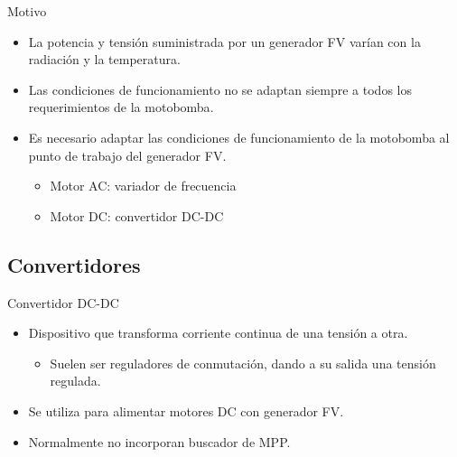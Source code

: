 \documentclass[xcolor={usenames,svgnames,dvipsnames}]{beamer}
\begin{document}
\begin{frame}[label={sec:org72d6883}]{Motivo}
\begin{itemize}
\item La \alert{potencia y tensión suministrada por un generador FV varían} con la radiación y la temperatura.

\item Las condiciones de funcionamiento \alert{no se adaptan siempre a todos los requerimientos de la motobomba}.

\item Es necesario adaptar las condiciones de funcionamiento de la motobomba al punto de trabajo del generador FV.

\begin{itemize}
\item \alert{Motor AC: variador de frecuencia}

\item \alert{Motor DC: convertidor DC-DC}
\end{itemize}
\end{itemize}
\end{frame}

\subsection{Convertidores}
\label{sec:org8749f2e}
\begin{frame}[label={sec:orgb78fae9}]{Convertidor DC-DC}
\begin{itemize}
\item Dispositivo que \alert{transforma corriente continua de una tensión a otra}.

\begin{itemize}
\item Suelen ser reguladores de conmutación, dando a su salida una tensión regulada.
\end{itemize}

\item Se utiliza para alimentar \alert{motores DC con generador FV}.

\item Normalmente no incorporan buscador de MPP.
\end{itemize}
\end{frame}
\end{document}
